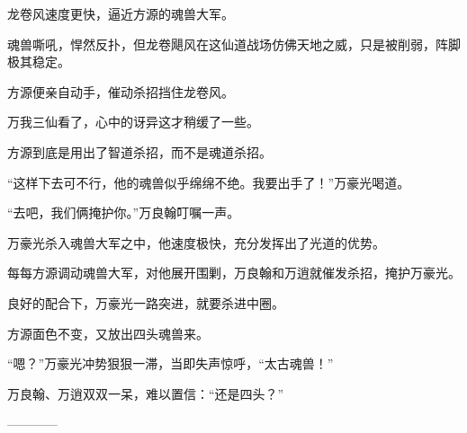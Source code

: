 \begin{this_body}
龙卷风速度更快，逼近方源的魂兽大军。

魂兽嘶吼，悍然反扑，但龙卷飓风在这仙道战场仿佛天地之威，只是被削弱，阵脚极其稳定。

方源便亲自动手，催动杀招挡住龙卷风。

万我三仙看了，心中的讶异这才稍缓了一些。

方源到底是用出了智道杀招，而不是魂道杀招。

“这样下去可不行，他的魂兽似乎绵绵不绝。我要出手了！”万豪光喝道。

“去吧，我们俩掩护你。”万良翰叮嘱一声。

万豪光杀入魂兽大军之中，他速度极快，充分发挥出了光道的优势。

每每方源调动魂兽大军，对他展开围剿，万良翰和万逍就催发杀招，掩护万豪光。

良好的配合下，万豪光一路突进，就要杀进中圈。

方源面色不变，又放出四头魂兽来。

“嗯？”万豪光冲势狠狠一滞，当即失声惊呼，“太古魂兽！”

万良翰、万逍双双一呆，难以置信：“还是四头？”

------------

\end{this_body}

